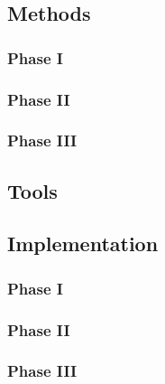 \documentclass[letterpaper,12pt]{article}
\begin{document}
    \subsection{Methods}
        \subsubsection{Phase I}
        \subsubsection{Phase II}
        \subsubsection{Phase III}
    \subsection{Tools}
    \subsection{Implementation}
        \subsubsection{Phase I}
        \subsubsection{Phase II}
        \subsubsection{Phase III}
        
\end{document}
